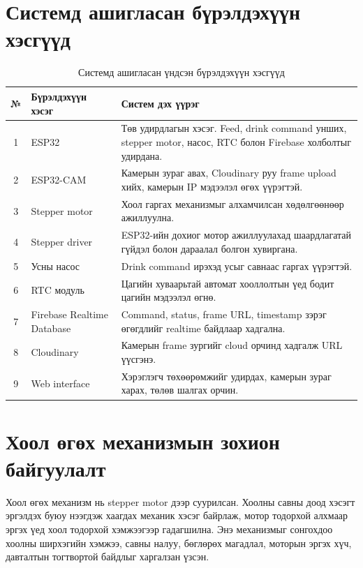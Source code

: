\documentclass[12pt,a4paper]{report}
\begin{document}
\section{Системд ашигласан бүрэлдэхүүн хэсгүүд}

\begin{table}[H]
\scriptsize
\centering
\caption{Системд ашигласан үндсэн бүрэлдэхүүн хэсгүүд}
\begin{tabularx}{\textwidth}{|c|X|X|}
\hline
\textbf{№} & \textbf{Бүрэлдэхүүн хэсэг} & \textbf{Систем дэх үүрэг} \\ \hline
1 & ESP32 & Төв удирдлагын хэсэг. Feed, drink command унших, stepper motor, насос, RTC болон Firebase холболтыг удирдана. \\ \hline
2 & ESP32-CAM & Камерын зураг авах, Cloudinary руу frame upload хийх, камерын IP мэдээлэл өгөх үүрэгтэй. \\ \hline
3 & Stepper motor & Хоол гаргах механизмыг алхамчилсан хөдөлгөөнөөр ажиллуулна. \\ \hline
4 & Stepper driver & ESP32-ийн дохиог мотор ажиллуулахад шаардлагатай гүйдэл болон дараалал болгон хувиргана. \\ \hline
5 & Усны насос & Drink command ирэхэд усыг савнаас гаргах үүрэгтэй. \\ \hline
6 & RTC модуль & Цагийн хуваарьтай автомат хооллолтын үед бодит цагийн мэдээлэл өгнө. \\ \hline
7 & Firebase Realtime Database & Command, status, frame URL, timestamp зэрэг өгөгдлийг realtime байдлаар хадгална. \\ \hline
8 & Cloudinary & Камерын frame зургийг cloud орчинд хадгалж URL үүсгэнэ. \\ \hline
9 & Web interface & Хэрэглэгч төхөөрөмжийг удирдах, камерын зураг харах, төлөв шалгах орчин. \\ \hline
\end{tabularx}
\end{table}

\section{Хоол өгөх механизмын зохион байгуулалт}

Хоол өгөх механизм нь stepper motor дээр суурилсан. Хоолны савны доод хэсэгт эргэлдэх буюу нээгдэж хаагдах механик хэсэг байрлаж, мотор тодорхой алхмаар эргэх үед хоол тодорхой хэмжээгээр гадагшилна. Энэ механизмыг сонгохдоо хоолны ширхэгийн хэмжээ, савны налуу, бөглөрөх магадлал, моторын эргэх хүч, давталтын тогтвортой байдлыг харгалзан үзсэн.
\end{document}

